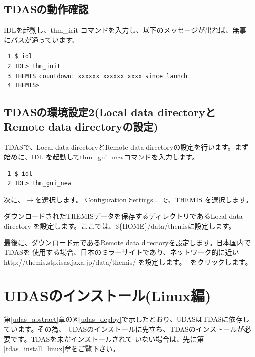 \documentclass[a4j]{jbook}
\begin{document}
\section{TDASの動作確認}
IDLを起動し、thm\_init コマンドを入力し、以下のメッセージが出れば、無事にパスが通っています。
\begin{screen}
\begin{verbatim}
 1 $ idl
 2 IDL> thm_init
 3 THEMIS countdown: xxxxxx xxxxxx xxxx since launch
 4 THEMIS>  
\end{verbatim}
\end{screen}

\section{TDASの環境設定2(Local data directoryとRemote data directoryの設定)}
TDASで、Local data directoryとRemote data directoryの設定を行います。まず始めに、IDL
を起動してthm\_gui\_newコマンドを入力します。
\begin{screen}
\begin{verbatim}
 1 $ idl
 2 IDL> thm_gui_new
\end{verbatim}
\end{screen}
次に、$\rightarrow$を選択します。
Configuration Settings... で、THEMIS を選択します。\par
ダウンロードされたTHEMISデータを保存するディレクトリであるLocal data directory
を設定します。ここでは、\$\{HOME\}/data/themisに設定します。\par
最後に、ダウンロード元であるRemote data directoryを設定します。日本国内でTDASを
使用する場合、日本のミラーサイトであり、ネットワーク的に近い
http://themis.stp.isas.jaxa.jp/data/themis/
を設定します。
-をクリックします。

\chapter{UDASのインストール(Linux編)}
\label{udas_install_linux}

第\ref{udas_abstract}章の図\ref{udas_deploy}で示したとおり、UDASはTDASに依存しています。その為、
UDASのインストールに先立ち、TDASのインストールが必要です。TDASを未だインストールされて
いない場合は、先に第\ref{tdas_install_linux}章をご覧下さい。
\end{document}
